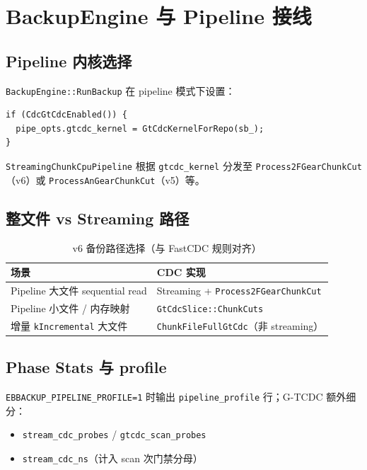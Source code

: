 \chapter{BackupEngine 与 Pipeline 接线}
\label{ch:engine-pipeline}

\section{Pipeline 内核选择}

\texttt{BackupEngine::RunBackup} 在 pipeline 模式下设置：
\begin{lstlisting}[caption={gtcdc\_kernel 注入 pipeline}]
if (CdcGtCdcEnabled()) {
  pipe_opts.gtcdc_kernel = GtCdcKernelForRepo(sb_);
}
\end{lstlisting}

\texttt{StreamingChunkCpuPipeline} 根据 \texttt{gtcdc\_kernel} 分发至 \texttt{Process2FGearChunkCut}（v6）或 \texttt{ProcessAnGearChunkCut}（v5）等。

\section{整文件 vs Streaming 路径}

\begin{table}[htbp]
\centering
\caption{v6 备份路径选择（与 FastCDC 规则对齐）}
\small
\begin{tabular}{@{}ll@{}}
\toprule
场景 & CDC 实现 \\
\midrule
Pipeline 大文件 sequential read & Streaming + \texttt{Process2FGearChunkCut} \\
Pipeline 小文件 / 内存映射 & \texttt{GtCdcSlice::ChunkCuts} \\
增量 \texttt{kIncremental} 大文件 & \texttt{ChunkFileFullGtCdc}（非 streaming） \\
\bottomrule
\end{tabular}
\end{table}

\section{Phase Stats 与 profile}

\texttt{EBBACKUP\_PIPELINE\_PROFILE=1} 时输出 \texttt{pipeline\_profile} 行；G-TCDC 额外细分：
\begin{itemize}[nosep]
  \item \texttt{stream\_cdc\_probes} / \texttt{gtcdc\_scan\_probes}
  \item \texttt{stream\_cdc\_ns}（计入 scan 次门禁分母）
\end{itemize}

